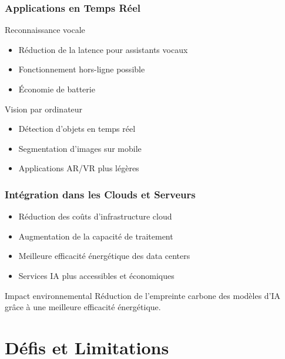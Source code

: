 \documentclass[10pt]{beamer}
\begin{document}
\begin{frame}
\frametitle{Applications en Temps Réel}
\begin{exampleblock}{Reconnaissance vocale}
\begin{itemize}
    \item Réduction de la latence pour assistants vocaux
    \item Fonctionnement hors-ligne possible
    \item Économie de batterie
\end{itemize}
\end{exampleblock}

\begin{exampleblock}{Vision par ordinateur}
\begin{itemize}
    \item Détection d'objets en temps réel
    \item Segmentation d'images sur mobile
    \item Applications AR/VR plus légères
\end{itemize}
\end{exampleblock}
\end{frame}

\begin{frame}
\frametitle{Intégration dans les Clouds et Serveurs}
\begin{itemize}
    \item Réduction des coûts d'infrastructure cloud
    \item Augmentation de la capacité de traitement
    \item Meilleure efficacité énergétique des data centers
    \item Services IA plus accessibles et économiques
\end{itemize}

\begin{block}{Impact environnemental}
Réduction de l'empreinte carbone des modèles d'IA grâce à une meilleure efficacité énergétique.
\end{block}
\end{frame}

\section{Défis et Limitations}
\end{document}
